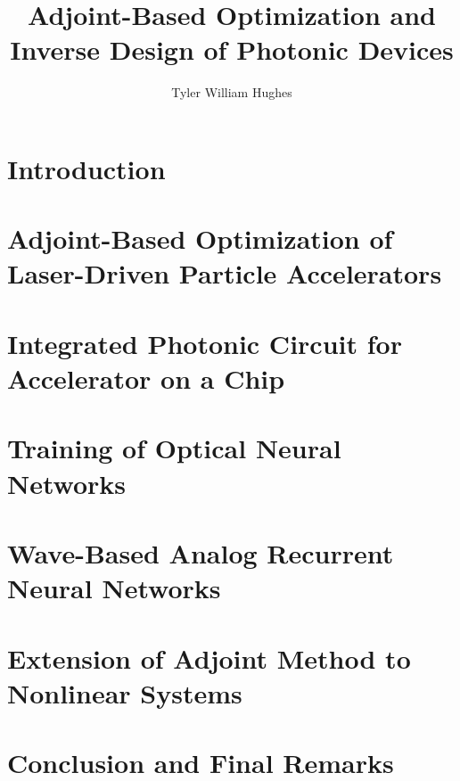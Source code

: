 \documentclass{report}
\begin{document}
\title{Adjoint-Based Optimization and Inverse Design of Photonic Devices}

\author{Tyler William Hughes}

 
\beforepreface
{}


\afterpreface




\chapter{Introduction}


\chapter{Adjoint-Based Optimization of Laser-Driven Particle Accelerators}


\chapter{Integrated Photonic Circuit for Accelerator on a Chip}


\chapter{Training of Optical Neural Networks}


\chapter{Wave-Based Analog Recurrent Neural Networks}


\chapter{Extension of Adjoint Method to Nonlinear Systems}


\chapter{Conclusion and Final Remarks}

\end{document}
